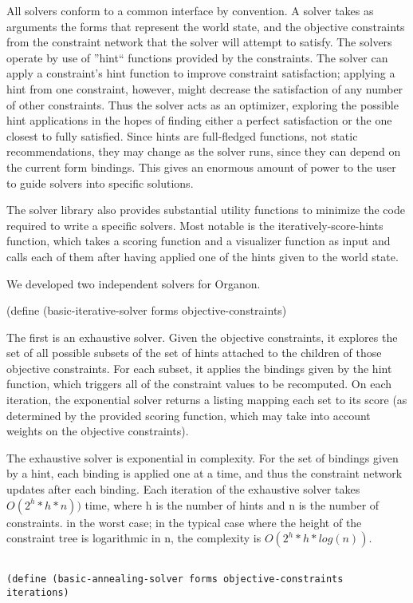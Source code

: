 \documentclass[12pt,a4paper]{article}
\begin{document}
All solvers conform to a common interface by convention. A solver takes as arguments the forms that represent the world state, and the objective constraints from the constraint network that the solver will attempt to satisfy. The solvers operate by use of ''hint`` functions provided by the constraints. The solver can apply a constraint's hint function to improve constraint satisfaction; applying a hint from one constraint, however, might decrease the satisfaction of any number of other constraints. Thus the solver acts as an optimizer, exploring the possible hint applications in the hopes of finding either a perfect satisfaction or the one closest to fully satisfied. Since hints are full-fledged functions, not static recommendations, they may change as the solver runs, since they can depend on the current form bindings. This gives an enormous amount of power to the user to guide solvers into specific solutions.

The solver library also provides substantial utility functions to minimize the code required to write a specific solvers. Most notable is the iteratively-score-hints function, which takes a scoring function and a visualizer function as input and calls each of them after having applied one of the hints given to the world state.

We developed two independent solvers for Organon. 

(define (basic-iterative-solver forms objective-constraints)

The first is an exhaustive solver. Given the objective constraints, it explores the set of all possible subsets of the set of hints attached to the children of those objective constraints. For each subset, it applies the bindings given by the hint function, which triggers all of the constraint values to be recomputed. On each iteration, the exponential solver returns a listing mapping each set to its score (as determined by the provided scoring function, which may take into account weights on the objective constraints).

The exhaustive solver is exponential in complexity. For the set of bindings given by a hint, each binding is applied one at a time, and thus the constraint network updates after each binding. Each iteration of the exhaustive solver takes $O(2^{h}*h*n))$ time, where h is the number of hints and n is the number of constraints. in the worst case; in the typical case where the height of the constraint tree is logarithmic in n, the complexity is $O(2^{h}*h*log(n))$.
\begin{lstlisting}

(define (basic-annealing-solver forms objective-constraints iterations)
\end{lstlisting}
\end{document}
